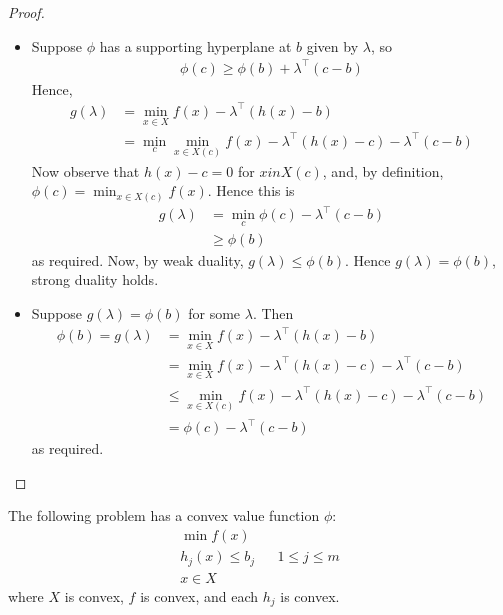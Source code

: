 \documentclass{../../template/note}
\begin{document}
    \begin{proof}
        \begin{itemize}
            \item[$\impliedby$] Suppose $\phi$ has a supporting hyperplane at $b$ given by $\lambda$, so
            \begin{align*}
                \phi(c) \geq \phi(b) + \lambda^\intercal (c-b)
            \end{align*}
            Hence,
            \begin{align*}
                g(\lambda) &= \min_{x \in X} f(x) - \lambda^\intercal (h(x)-b) \\
                &= \min_c \min_{x \in X(c)} f(x) - \lambda^\intercal (h(x)-c) - \lambda^\intercal (c-b)
            \end{align*}
            Now observe that $h(x)-c = 0$ for $x in X(c)$, and, by definition, $\phi(c) = \min_{x \in X(c)} f(x)$. Hence this is
            \begin{align*}
                g(\lambda) &= \min_{c} \phi(c) - \lambda^\intercal (c-b) \\
                &\geq \phi(b)
            \end{align*}
            as required. Now, by weak duality, $g(\lambda) \leq \phi(b)$. Hence $g(\lambda) = \phi(b)$, strong duality holds.
            \item[$\implies$] Suppose $g(\lambda) = \phi(b)$ for some $\lambda$. Then
            \begin{align*}
                \phi(b) = g(\lambda) &= \min_{x \in X} f(x) - \lambda^\intercal (h(x)-b) \\
                &= \min_{x \in X} f(x) - \lambda^\intercal (h(x)-c) - \lambda^\intercal (c-b) \\
                &\leq \min_{x \in X(c)} f(x) - \lambda^\intercal (h(x)-c) - \lambda^\intercal (c-b) \\
                &= \phi(c) - \lambda^\intercal (c-b)
            \end{align*}
            as required.          
        \end{itemize}
    \end{proof}  
    
    \begin{theorem}
        The following problem has a convex value function $\phi$:
        \begin{align*}
            \min f(x) \\
            h_j(x) \leq b_j && 1 \leq j \leq m \\
            x \in X
        \end{align*}
        where $X$ is convex, $f$ is convex, and each $h_j$ is convex.        
    \end{theorem}
    
\end{document}
